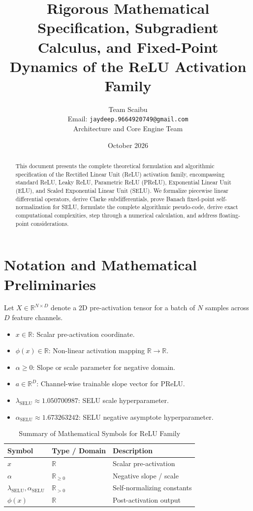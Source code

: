 \documentclass[11pt,a4paper]{article}
\title{\textbf{Rigorous Mathematical Specification, Subgradient Calculus, and Fixed-Point Dynamics of the ReLU Activation Family}}
\author{Team Scaibu \\ \small Email: \texttt{jaydeep.9664920749@gmail.com} \\ \small Architecture and Core Engine Team}
\date{October 2026}
\theoremstyle{definition}
\begin{document}
\maketitle

\begin{abstract}
This document presents the complete theoretical formulation and algorithmic specification of the Rectified Linear Unit (ReLU) activation family, encompassing standard ReLU, Leaky ReLU, Parametric ReLU (PReLU), Exponential Linear Unit (ELU), and Scaled Exponential Linear Unit (SELU). We formalize piecewise linear differential operators, derive Clarke subdifferentials, prove Banach fixed-point self-normalization for SELU, formulate the complete algorithmic pseudo-code, derive exact computational complexities, step through a numerical calculation, and address floating-point considerations.
\end{abstract}

\section{Notation and Mathematical Preliminaries}

Let $X \in \mathbb{R}^{N \times D}$ denote a 2D pre-activation tensor for a batch of $N$ samples across $D$ feature channels.

\begin{itemize}
    \item $x \in \mathbb{R}$: Scalar pre-activation coordinate.
    \item $\phi(x) \in \mathbb{R}$: Non-linear activation mapping $\mathbb{R} \to \mathbb{R}$.
    \item $\alpha \ge 0$: Slope or scale parameter for negative domain.
    \item $a \in \mathbb{R}^D$: Channel-wise trainable slope vector for PReLU.
    \item $\lambda_{\text{SELU}} \approx 1.050700987$: SELU scale hyperparameter.
    \item $\alpha_{\text{SELU}} \approx 1.673263242$: SELU negative asymptote hyperparameter.
\end{itemize}

\begin{table}[h]
\centering
\caption{Summary of Mathematical Symbols for ReLU Family}
\begin{tabular}{lll}
\toprule
\textbf{Symbol} & \textbf{Type / Domain} & \textbf{Description} \\
\midrule
$x$ & $\mathbb{R}$ & Scalar pre-activation \\
$\alpha$ & $\mathbb{R}_{\ge 0}$ & Negative slope / scale \\
$\lambda_{\text{SELU}}, \alpha_{\text{SELU}}$ & $\mathbb{R}_{> 0}$ & Self-normalizing constants \\
$\phi(x)$ & $\mathbb{R}$ & Post-activation output \\
\bottomrule
\end{tabular}
\end{table}
\end{document}
